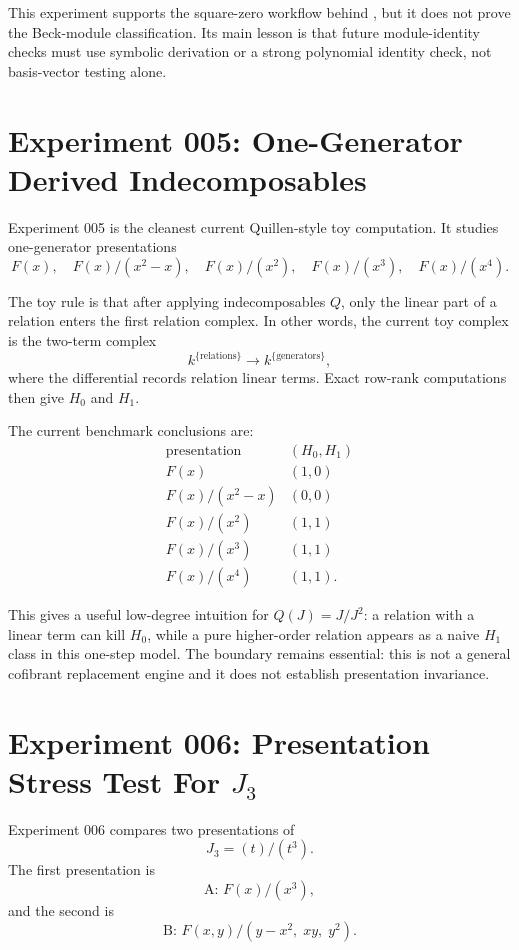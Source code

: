 \documentclass[11pt]{report}
\theoremstyle{definition}
\theoremstyle{plain}
\begin{document}
This experiment supports the square-zero workflow behind ,
but it does not prove the Beck-module classification. Its main lesson is that
future module-identity checks must use symbolic derivation or a strong
polynomial identity check, not basis-vector testing alone.

\section{Experiment 005: One-Generator Derived Indecomposables}

Experiment 005 is the cleanest current Quillen-style toy computation. It
studies one-generator presentations
\[
  F(x),\quad
  F(x)/(x^2-x),\quad
  F(x)/(x^2),\quad
  F(x)/(x^3),\quad
  F(x)/(x^4).
\]

The toy rule is that after applying indecomposables \(Q\), only the linear part
of a relation enters the first relation complex. In other words, the current
toy complex is the two-term complex
\[
  k^{\{\text{relations}\}}
  \longrightarrow
  k^{\{\text{generators}\}},
\]
where the differential records relation linear terms. Exact row-rank
computations then give \(H_0\) and \(H_1\).

The current benchmark conclusions are:
\[
\begin{array}{c|c}
\text{presentation} & (H_0,H_1) \\
\hline
F(x) & (1,0) \\
F(x)/(x^2-x) & (0,0) \\
F(x)/(x^2) & (1,1) \\
F(x)/(x^3) & (1,1) \\
F(x)/(x^4) & (1,1).
\end{array}
\]

This gives a useful low-degree intuition for \(Q(J)=J/J^2\): a relation with a
linear term can kill \(H_0\), while a pure higher-order relation appears as a
naive \(H_1\) class in this one-step model. The boundary remains essential:
this is not a general cofibrant replacement engine and it does not establish
presentation invariance.

\section{\texorpdfstring{Experiment 006: Presentation Stress Test For \(J_3\)}{Experiment 006: Presentation Stress Test For J3}}

Experiment 006 compares two presentations of
\[
  J_3=(t)/(t^3).
\]
The first presentation is
\[
  \text{A: } F(x)/(x^3),
\]
and the second is
\[
  \text{B: } F(x,y)/(y-x^2,\;xy,\;y^2).
\]
\end{document}
